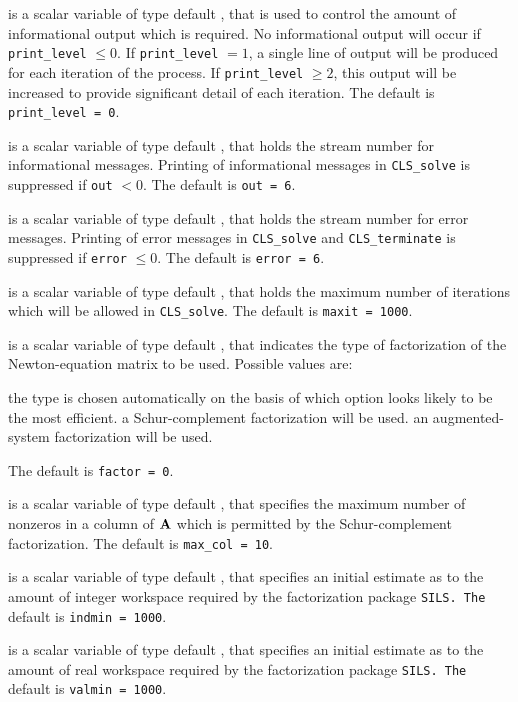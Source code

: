 \documentclass{galahad}
\newcommand{\packagename}{CLS}
\begin{document}
\begin{description}

 is a scalar variable of type default \integer, that is used
to control the amount of informational output which is required. No
informational output will occur if {\tt print\_level} $\leq 0$. If
{\tt print\_level} $= 1$, a single line of output will be produced for each
iteration of the process. If {\tt print\_level} $\geq 2$, this output will be
increased to provide significant detail of each iteration.
The default is {\tt print\_level = 0}.

 is a scalar variable of type default \integer, that holds the
stream number for informational messages. Printing of informational messages in
{\tt \packagename\_solve} is suppressed if {\tt out} $< 0$.
The default is {\tt out = 6}.

 is a scalar variable of type default \integer, that holds the
stream number for error messages. Printing of error messages in
{\tt \packagename\_solve} and {\tt \packagename\_terminate} is suppressed if
{\tt error} $\leq 0$.
The default is {\tt error = 6}.

 is a scalar variable of type default \integer, that holds the
maximum number of iterations which will be allowed in {\tt \packagename\_solve}.
The default is {\tt maxit = 1000}.

 is a scalar variable of type default \integer, that indicates
the type of factorization of the Newton-equation matrix to be used.
Possible values are:

\begin{description}
 the type is chosen automatically on the basis of which option looks
        likely to be the most efficient.
 a Schur-complement factorization will be used.
 an augmented-system factorization will be used.
\end{description}
The default is {\tt factor = 0}.

 is a scalar variable of type default \integer, that specifies
the maximum number of nonzeros in a column of ${\mathbf{A}}$ which is permitted
by the Schur-complement factorization.
The default is {\tt max\_col = 10}.

 is a scalar variable of type default \integer, that specifies
an initial estimate as to the amount of integer workspace required by
the factorization package {\tt SILS.
The} default is {\tt indmin = 1000}.

 is a scalar variable of type default \integer, that specifies
an initial estimate as to the amount of real workspace required by
the factorization package {\tt SILS.
The} default is {\tt valmin = 1000}.


\end{description}
\end{document}
